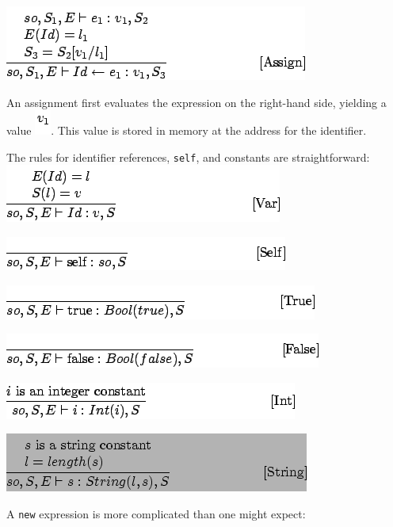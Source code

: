 \documentclass[]{article}
\begin{document}
\includegraphics{img157.png}

An assignment first evaluates the expression on the right-hand side,
yielding a value \includegraphics{img158.png}. This value is stored in
memory at the address for the identifier.

The rules for identifier references, \texttt{self}, and constants are
straightforward: \\

\includegraphics{img159.png}

\includegraphics{img160.png}

\includegraphics{img161.png}

\includegraphics{img162.png}

\includegraphics{img163.png}

\includegraphics{img164.png}

A \texttt{new} expression is more complicated than one might expect: \\
\end{document}
